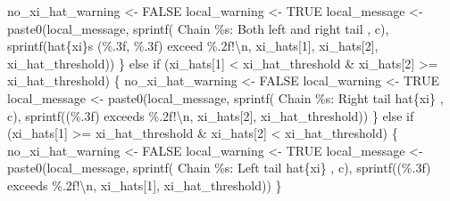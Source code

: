 \documentclass[
  letterpaper,
  DIV=11,
  numbers=noendperiod]{scrartcl}
\newenvironment{Shaded}{\begin{snugshade}}{\end{snugshade}}
\newcommand{\CharTok}[1]{\textcolor[rgb]{0.13,0.47,0.30}{#1}}
\newcommand{\ControlFlowTok}[1]{\textcolor[rgb]{0.00,0.23,0.31}{#1}}
\newcommand{\DecValTok}[1]{\textcolor[rgb]{0.68,0.00,0.00}{#1}}
\newcommand{\NormalTok}[1]{\textcolor[rgb]{0.00,0.23,0.31}{#1}}
\newcommand{\OperatorTok}[1]{\textcolor[rgb]{0.37,0.37,0.37}{#1}}
\newcommand{\SpecialCharTok}[1]{\textcolor[rgb]{0.37,0.37,0.37}{#1}}
\newcommand{\StringTok}[1]{\textcolor[rgb]{0.13,0.47,0.30}{#1}}
\begin{document}
\begin{Shaded}
\begin{Highlighting}[]
\NormalTok{        no\_xi\_hat\_warning }\OperatorTok{\textless{}{-}}\NormalTok{ FALSE}
\NormalTok{        local\_warning }\OperatorTok{\textless{}{-}}\NormalTok{ TRUE}
\NormalTok{        local\_message }\OperatorTok{\textless{}{-}}
\NormalTok{          paste0(local\_message,}
\NormalTok{                sprintf(}\StringTok{\textquotesingle{}  Chain }\SpecialCharTok{\%s}\StringTok{: Both left and right tail \textquotesingle{}}\NormalTok{, c),}
\NormalTok{                sprintf(}\StringTok{\textquotesingle{}hat}\SpecialCharTok{\{xi\}}\StringTok{s (}\SpecialCharTok{\%.3f}\StringTok{, }\SpecialCharTok{\%.3f}\StringTok{) exceed }\SpecialCharTok{\%.2f}\StringTok{!}\CharTok{\textbackslash{}n}\StringTok{\textquotesingle{}}\NormalTok{, }
\NormalTok{                        xi\_hats[}\DecValTok{1}\NormalTok{], xi\_hats[}\DecValTok{2}\NormalTok{], xi\_hat\_threshold))}
\NormalTok{      \} }\ControlFlowTok{else} \ControlFlowTok{if}\NormalTok{ (xi\_hats[}\DecValTok{1}\NormalTok{] }\OperatorTok{\textless{}}\NormalTok{ xi\_hat\_threshold }\OperatorTok{\&} 
\NormalTok{                 xi\_hats[}\DecValTok{2}\NormalTok{] }\OperatorTok{\textgreater{}=}\NormalTok{ xi\_hat\_threshold) \{}
\NormalTok{        no\_xi\_hat\_warning }\OperatorTok{\textless{}{-}}\NormalTok{ FALSE}
\NormalTok{        local\_warning }\OperatorTok{\textless{}{-}}\NormalTok{ TRUE}
\NormalTok{        local\_message }\OperatorTok{\textless{}{-}}
\NormalTok{          paste0(local\_message,}
\NormalTok{                 sprintf(}\StringTok{\textquotesingle{}  Chain }\SpecialCharTok{\%s}\StringTok{: Right tail hat}\SpecialCharTok{\{xi\}}\StringTok{ \textquotesingle{}}\NormalTok{, c),}
\NormalTok{                 sprintf(}\StringTok{\textquotesingle{}(}\SpecialCharTok{\%.3f}\StringTok{) exceeds }\SpecialCharTok{\%.2f}\StringTok{!}\CharTok{\textbackslash{}n}\StringTok{\textquotesingle{}}\NormalTok{,}
\NormalTok{                         xi\_hats[}\DecValTok{2}\NormalTok{], xi\_hat\_threshold))}
\NormalTok{      \} }\ControlFlowTok{else} \ControlFlowTok{if}\NormalTok{ (xi\_hats[}\DecValTok{1}\NormalTok{] }\OperatorTok{\textgreater{}=}\NormalTok{ xi\_hat\_threshold }\OperatorTok{\&} 
\NormalTok{                 xi\_hats[}\DecValTok{2}\NormalTok{] }\OperatorTok{\textless{}}\NormalTok{ xi\_hat\_threshold) \{}
\NormalTok{        no\_xi\_hat\_warning }\OperatorTok{\textless{}{-}}\NormalTok{ FALSE}
\NormalTok{        local\_warning }\OperatorTok{\textless{}{-}}\NormalTok{ TRUE}
\NormalTok{        local\_message }\OperatorTok{\textless{}{-}}
\NormalTok{          paste0(local\_message,}
\NormalTok{                 sprintf(}\StringTok{\textquotesingle{}  Chain }\SpecialCharTok{\%s}\StringTok{: Left tail hat}\SpecialCharTok{\{xi\}}\StringTok{ \textquotesingle{}}\NormalTok{, c),}
\NormalTok{                 sprintf(}\StringTok{\textquotesingle{}(}\SpecialCharTok{\%.3f}\StringTok{) exceeds }\SpecialCharTok{\%.2f}\StringTok{!}\CharTok{\textbackslash{}n}\StringTok{\textquotesingle{}}\NormalTok{,}
\NormalTok{                         xi\_hats[}\DecValTok{1}\NormalTok{], xi\_hat\_threshold))}
\NormalTok{      \}}
      

\end{Highlighting}
\end{Shaded}
\end{document}
